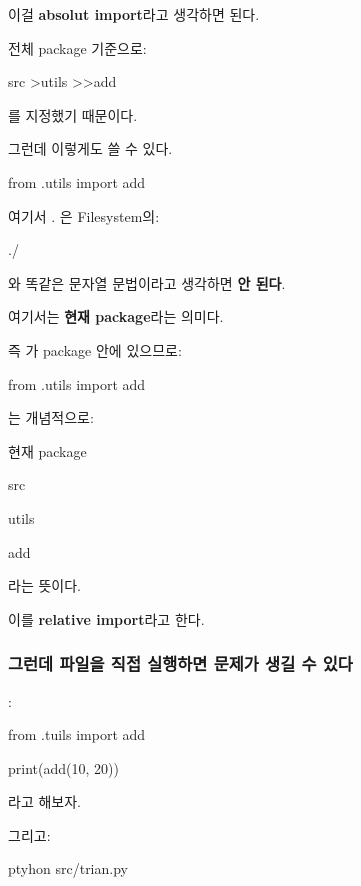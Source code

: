 이걸 \textbf{absolut import}라고 생각하면 된다.

전체 package 기준으로:

\begin{dhkdir}
src
>utils
>>add
\end{dhkdir}

를 지정했기 때문이다.

그런데 이렇게도 쓸 수 있다.

\begin{dhkcode}
from .utils import add
\end{dhkcode}

여기서 . 은 Filesystem의:

\begin{dhkzsh}
./
\end{dhkzsh}

와 똑같은 문자열 문법이라고 생각하면 \textbf{안 된다}.

여기서는 \textbf{현재 package}라는 의미다.

즉 가  package 안에 있으므로:

\begin{dhkcode}
from .utils import add
\end{dhkcode}

는 개념적으로:

\begin{dhksmry}[centered]
현재 package

\da

src

\da

utils

\da

add
\end{dhksmry}

라는 뜻이다.

이를 \textbf{relative import}라고 한다.

\subsubsection{그런데 파일을 직접 실행하면 문제가 생길 수 있다}

:

\begin{dhkcode}
from .tuils import add

print(add(10, 20))
\end{dhkcode}

라고 해보자.

그리고:

\begin{dhkzsh}
ptyhon src/trian.py
\end{dhkzsh}

